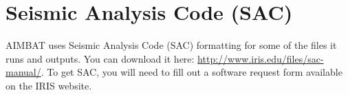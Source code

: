 \documentclass[letterpaper,10pt]{article}
\begin{document}
\section{Seismic Analysis Code (SAC)}

AIMBAT uses Seismic Analysis Code (SAC) formatting for some of the files it runs and outputs. You can download it here: \url{http://www.iris.edu/files/sac-manual/}. To get SAC, you will need to fill out a software request form available on the IRIS website.




















\end{document}

